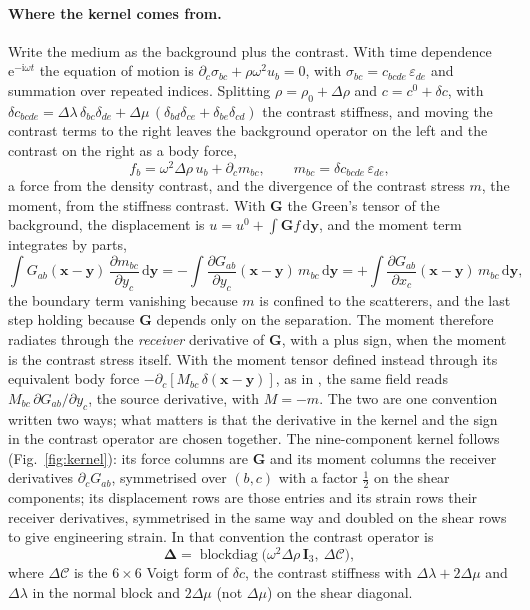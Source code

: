 \documentclass[11pt,a4paper]{article}
\newcommand{\bI}{\mathbf{I}}
\newcommand{\bD}{\boldsymbol{\Delta}}
\newcommand{\bG}{\mathbf{G}}
\newcommand{\dd}{\mathrm{d}}
\begin{document}
\paragraph{Where the kernel comes from.} Write the medium as the background plus the contrast. With
time dependence $\mathrm{e}^{-\mathrm{i}\omega t}$ the equation of motion is
$\partial_c\sigma_{bc}+\rho\omega^2u_b=0$, with $\sigma_{bc}=c_{bcde}\,\varepsilon_{de}$ and
summation over repeated indices. Splitting $\rho=\rho_0+\Delta\rho$ and $c=c^0+\delta c$, with
$\delta c_{bcde}=\Delta\lambda\,\delta_{bc}\delta_{de}+\Delta\mu\,(\delta_{bd}\delta_{ce}+\delta_{be}\delta_{cd})$
the contrast stiffness, and moving the contrast terms to the right leaves the background operator on
the left and the contrast on the right as a body force,
\begin{equation}\label{eq:bodyforce}
  f_b=\omega^2\Delta\rho\,u_b+\partial_c m_{bc},\qquad m_{bc}=\delta c_{bcde}\,\varepsilon_{de},
\end{equation}
a force from the density contrast, and the divergence of the contrast stress $m$, the moment, from
the stiffness contrast. With $\bG$ the Green's tensor of the background, the displacement is
$u=u^0+\int\bG f\,\dd\mathbf y$, and the moment term integrates by parts,
\begin{equation}\label{eq:byparts}
  \int G_{ab}(\mathbf x-\mathbf y)\,\frac{\partial m_{bc}}{\partial y_c}\,\dd\mathbf y
  =-\int\frac{\partial G_{ab}}{\partial y_c}(\mathbf x-\mathbf y)\,m_{bc}\,\dd\mathbf y
  =+\int\frac{\partial G_{ab}}{\partial x_c}(\mathbf x-\mathbf y)\,m_{bc}\,\dd\mathbf y ,
\end{equation}
the boundary term vanishing because $m$ is confined to the scatterers, and the last step holding
because $\bG$ depends only on the separation. The moment therefore radiates through the
\emph{receiver} derivative of $\bG$, with a plus sign, when the moment is the contrast stress
itself. With the moment tensor defined instead through its equivalent body force
$-\partial_c[M_{bc}\,\delta(\mathbf x-\mathbf y)]$, as in \citet{Aki2002}, the same field reads
$M_{bc}\,\partial G_{ab}/\partial y_c$, the source derivative, with $M=-m$. The two are one
convention written two ways; what matters is that the derivative in the kernel and the sign in the
contrast operator are chosen together. The nine-component kernel follows (Fig.~\ref{fig:kernel}): its force columns are
$\bG$ and its moment columns the receiver derivatives $\partial_cG_{ab}$, symmetrised over $(b,c)$
with a factor $\tfrac12$ on the shear components; its displacement rows are those entries and its
strain rows their receiver derivatives, symmetrised in the same way and doubled on the shear rows to
give engineering strain. In that convention the contrast operator is
\begin{equation}\label{eq:delta}
  \bD=\operatorname{blockdiag}\!\bigl(\omega^2\Delta\rho\,\bI_3,\ \Delta\mathcal{C}\bigr),
\end{equation}
where $\Delta\mathcal{C}$ is the $6\times6$ Voigt form of $\delta c$, the contrast stiffness with $\Delta\lambda+2\Delta\mu$ and
$\Delta\lambda$ in the normal block and $2\Delta\mu$ (not $\Delta\mu$) on the shear diagonal.
\end{document}
